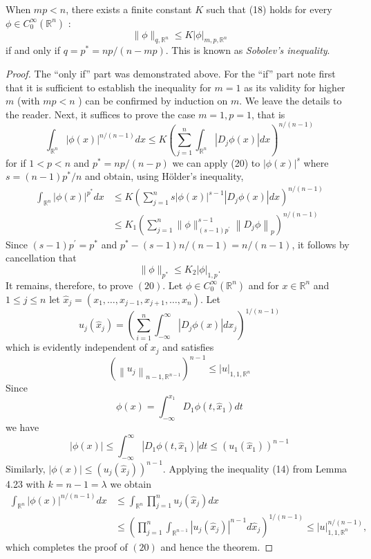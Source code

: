 \begin{theorem}
  When $m p<n$, there exists a finite constant $K$ such that (18) holds for every $\phi \in C_0^{\infty}\left(\mathbb{R}^n\right)$ :
  \[
  \|\phi\|_{q, \mathbb{R}^n} \leq K|\phi|_{m, p, \mathbb{R}^n}
  \]
  if and only if $q=p^*=n p /(n-m p)$. This is known as \emph{Sobolev's inequality}.
\end{theorem}

\begin{proof}
  The ``only if'' part was demonstrated above. For the ``if'' part note first that it is sufficient to establish the inequality for $m=1$ as its validity for higher $m$ (with $m p<n$ ) can be confirmed by induction on $m$. We leave the details to the reader.
  Next, it suffices to prove the case $m=1, p=1$, that is
  \[
  \int_{\mathbb{R}^n}|\phi(x)|^{n /(n-1)} d x \leq K\left(\sum_{j=1}^n \int_{\mathbb{R}^n}\left|D_j \phi(x)\right| d x\right)^{n /(n-1)}
  \]
  for if $1<p<n$ and $p^*=n p /(n-p)$ we can apply (20) to $|\phi(x)|^s$ where $s=(n-1) p^* / n$ and obtain, using Hölder's inequality,
  \[
  \begin{aligned}
  \int_{\mathbb{R}^n}|\phi(x)|^{p^*} d x & \leq K\left(\sum_{j=1}^n s|\phi(x)|^{s-1}\left|D_j \phi(x)\right| d x\right)^{n /(n-1)} \\
  & \leq K_1\left(\sum_{j=1}^n\|\phi\|_{(s-1) p^{\prime}}^{s-1}\left\|D_j \phi\right\|_p\right)^{n /(n-1)}
  \end{aligned}
  \]
  Since $(s-1) p^{\prime}=p^*$ and $p^*-(s-1) n /(n-1)=n /(n-1)$, it follows by cancellation that
  \[\|\phi\|_{p^*} \leq K_2 |\phi|_{1,p}.\]
  It remains, therefore, to prove $(20)$. Let $\phi \in C_0^{\infty}\left(\mathbb{R}^n\right)$ and for $x \in \mathbb{R}^n$ and $1 \leq j \leq n$ let $\hat{x}_j=\left(x_1, \ldots, x_{j-1}, x_{j+1}, \ldots, x_n\right)$. Let
  \[
  u_j\left(\hat{x}_j\right)=\left(\sum_{i=1}^n \int_{-\infty}^{\infty}\left|D_j \phi(x)\right| d x_j\right)^{1 /(n-1)}
  \]
  which is evidently independent of $x_j$ and satisfies
  \[
  \left(\left\|u_j\right\|_{n-1, \mathbb{R}^{n-1}}\right)^{n-1} \leq|u|_{1,1, \mathbb{R}^n}
  \]
  Since
  \[
  \phi(x)=\int_{-\infty}^{x_1} D_1 \phi\left(t, \hat{x}_1\right) d t
  \]
  we have
  \[
  |\phi(x)| \leq \int_{-\infty}^{\infty}\left|D_1 \phi\left(t, \hat{x}_1\right)\right| d t \leq\left(u_1\left(\hat{x}_1\right)\right)^{n-1}
  \]
  Similarly, $|\phi(x)| \leq\left(u_j\left(\hat{x}_j\right)\right)^{n-1}$. Applying the inequality (14) from Lemma 4.23 with $k=n-1=\lambda$ we obtain
  \[
  \begin{aligned}
  \int_{\mathbb{R}^n}|\phi(x)|^{n /(n-1)} d x & \leq \int_{\mathbb{R}^n} \prod_{j=1}^n u_j\left(\hat{x}_j\right) d x \\
  & \leq\left(\prod_{j=1}^n \int_{\mathbb{R}^{n-1}}\left|u_j\left(\hat{x}_j\right)\right|^{n-1} d \hat{x}_j\right)^{1 /(n-1)} \leq|u|_{1,1, \mathbb{R}^n}^{n /(n-1)},
  \end{aligned}
  \]
  which completes the proof of $(20)$ and hence the theorem.
\end{proof}


